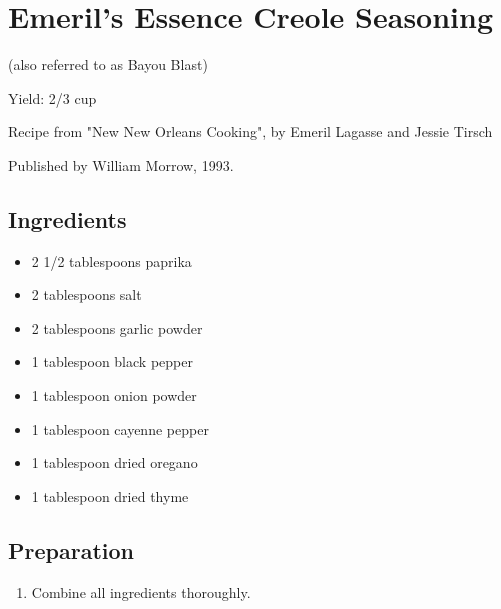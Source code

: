 \section{Emeril's Essence Creole Seasoning}

(also referred to as Bayou Blast)

\noindent Yield: 2/3 cup

\noindent Recipe from "New New Orleans Cooking", by Emeril Lagasse and Jessie Tirsch

\noindent Published by William Morrow, 1993.

\subsection{Ingredients}
\begin{itemize}
    \item 2 1/2 tablespoons paprika
    \item 2 tablespoons salt
    \item 2 tablespoons garlic powder
    \item 1 tablespoon black pepper
    \item 1 tablespoon onion powder
    \item 1 tablespoon cayenne pepper
    \item 1 tablespoon dried oregano
    \item 1 tablespoon dried thyme
\end{itemize}

\subsection{Preparation}
\begin{enumerate}
    \item Combine all ingredients thoroughly.
\end{enumerate}
